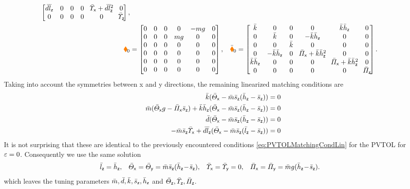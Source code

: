 \begin{subequations}
\begin{align*}
\begin{bmatrix}
  \dc\lcz & 0 & 0 & 0 & \!\sigcx+\dc\lcz^2\! & 0 \\
  0 & 0 & 0 & 0 & 0 & \!\sigcz\! \\
 \end{bmatrix},
\\ 
 \sysStiffMatLin &= 
 \begin{bmatrix}
  0 & 0 & 0 & 0 & -m\gravityAccConst & 0 \\
  0 & 0 & 0 & m\gravityAccConst & 0 & 0 \\
  0 & 0 & 0 & 0 & 0 & 0 \\
  0 & 0 & 0 & 0 & 0 & 0 \\
  0 & 0 & 0 & 0 & 0 & 0 \\
  0 & 0 & 0 & 0 & 0 & 0 \\
  \end{bmatrix},&
 \sysStiffMatCLin &=
 \begin{bmatrix}
  \kc & 0 & 0 & 0 & \kc\hcz & 0 \\
  0 & \kc & 0 & -\kc\hcz & 0 & 0 \\
  0 & 0 & \kc & 0 & 0 & 0 \\
  0 & -\kc\hcz & 0 & \!\kapcx+\kc\hcz^2\! & 0 & 0 \\
  \kc\hcz & 0 & 0 & 0 & \!\kapcx+\kc\hcz^2\! & 0 \\
  0 & 0 & 0 & 0 & 0 & \!\kapcz\! \\
 \end{bmatrix}.
\end{align*}
\end{subequations}
Taking into account the symmetries between x and y directions, the remaining linearized matching conditions are
\begin{subequations}
\begin{align}
 \bar{k}(\bar{\varTheta}_{\mathsf{x}} - \bar{m}\bar{s}_{\mathsf{z}}(\bar{h}_{\mathsf{z}} - \bar{s}_{\mathsf{z}})) &= 0
\\
 \bar{m}(\bar{\varTheta}_{\mathsf{x}}g - \bar{\varPi}_{\mathsf{x}}\bar{s}_{\mathsf{z}}) + \bar{k}\bar{h}_{\mathsf{z}}(\bar{\varTheta}_{\mathsf{x}} - \bar{m}\bar{s}_{\mathsf{z}}(\bar{h}_{\mathsf{z}} - \bar{s}_{\mathsf{z}})) &= 0
\\
 \bar{d}(\bar{\varTheta}_{\mathsf{x}} - \bar{m}\bar{s}_{\mathsf{z}}(\bar{h}_{\mathsf{z}} - \bar{s}_{\mathsf{z}})) &= 0
\\
 -\bar{m}\bar{s}_{\mathsf{z}}\bar{\varUpsilon}_{\mathsf{x}} + \bar{d}\bar{l}_{\mathsf{z}}(\bar{\varTheta}_{\mathsf{x}} - \bar{m}\bar{s}_{\mathsf{z}}(\bar{l}_{\mathsf{z}} - \bar{s}_{\mathsf{z}})) &= 0
\end{align} 
\end{subequations}
It is not surprising that these are identical to the previously encountered conditions \eqref{eq:PVTOLMatchingCondLin} for the PVTOL for $\varepsilon=0$.
Consequently we use the same solution
\begin{align}\label{eq:CtrlExampleQuatMatchedParam}
 \bar{l}_{\mathsf{z}} &= \bar{h}_{\mathsf{z}},&
 \bar{\varTheta}_{\mathsf{x}} = \bar{\varTheta}_{\mathsf{y}} &= \bar{m}\bar{s}_{\mathsf{z}}(\bar{h}_{\mathsf{z}} \!-\! \bar{s}_{\mathsf{z}}),&
 \bar{\varUpsilon}_{\mathsf{x}} = \bar{\varUpsilon}_{\mathsf{y}} &= 0,&
 \bar{\varPi}_{\mathsf{x}} = \bar{\varPi}_{\mathsf{y}} &= \bar{m}g(\bar{h}_{\mathsf{z}} \!-\! \bar{s}_{\mathsf{z}}).
\end{align}
which leaves the tuning parameters $\bar{m}, \bar{d}, \bar{k}, \bar{s}_{\mathsf{z}}, \bar{h}_{\mathsf{z}}$ and $\bar{\varTheta}_{\mathsf{z}}, \bar{\varUpsilon}_{\mathsf{z}}, \bar{\varPi}_{\mathsf{z}}$.

